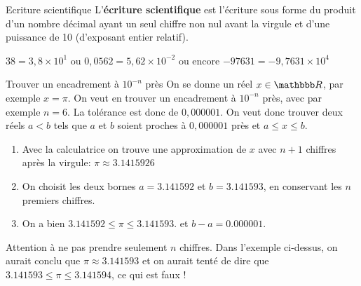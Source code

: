 \documentclass[10pt,a4paper,openany,twoside,prof]{book}
\begin{document}
\begin{defi}{Ecriture scientifique}{}
	L'\textbf{écriture scientifique} est l'écriture sous forme du produit d'un nombre décimal ayant un seul chiffre non nul avant la virgule et d'une puissance de 10 (d'exposant entier relatif).
\end{defi}

\begin{ex}{}{}
	$38 = 3,8 \times 10^1$ \hspace{0.8cm} ou \hspace{0.8cm} $0,0562 = 5,62 \times 10^{-2}$ \hspace{0.8cm}ou  encore \hspace{0.8cm} $-97631 = - 9,7631 \times 10^{4}$
\end{ex}

\begin{methode}{Trouver un encadrement à $10^{-n}$ près}{}
	On se donne un réel $x\in\R$, par exemple $x=\pi$. On veut en trouver un encadrement à $10^{-n}$ près, avec par exemple $n=6$. La tolérance est donc de $0,000001$.
	On veut donc trouver deux réels $a<b$ tels que $a$ et $b$ soient proches à $0,000001$ près et $a\le x\le b$.

	\begin{enumerate}
		\item
		Avec la calculatrice on trouve une approximation de $x$ avec $n+1$ chiffres après la virgule:
		$\pi\approx 3.1415926$
		\item
		On choisit les deux bornes $a = 3.141592$ et $b=3.141593$, en conservant les $n$ premiers chiffres.
		\item
		On a bien $3.141592\le \pi \le 3.141593$. et $b-a=0.000001$.
	\end{enumerate}


\end{methode}

\begin{rem}{}{}
	Attention à ne pas prendre seulement $n$ chiffres. Dans l'exemple ci-dessus, on aurait conclu que $\pi\approx 3.141593$ et on aurait tenté de dire que $3.141593\le \pi \le 3.141594$, ce qui est faux !
\end{rem}
\end{document}
